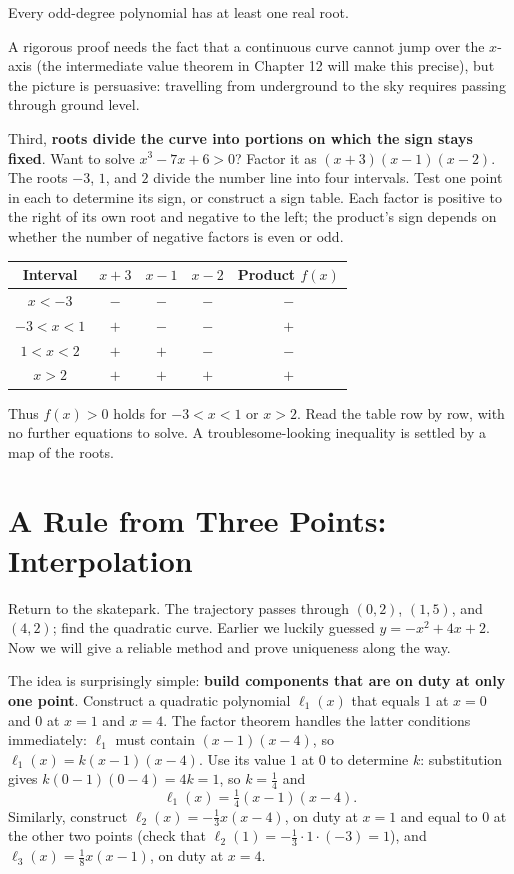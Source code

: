 \begin{tuilun}
Every odd-degree polynomial has at least one real root.
\end{tuilun}

A rigorous proof needs the fact that a continuous curve cannot jump over the $x$-axis (the intermediate value theorem in Chapter 12 will make this precise), but the picture is persuasive: travelling from underground to the sky requires passing through ground level.

Third, \textbf{roots divide the curve into portions on which the sign stays fixed}. Want to solve $x^3-7x+6>0$? Factor it as $(x+3)(x-1)(x-2)$. The roots $-3$, $1$, and $2$ divide the number line into four intervals. Test one point in each to determine its sign, or construct a sign table. Each factor is positive to the right of its own root and negative to the left; the product's sign depends on whether the number of negative factors is even or odd.

\begin{center}
\begin{tabular}{ccccc}
\toprule
Interval & $x+3$ & $x-1$ & $x-2$ & Product $f(x)$ \\
\midrule
$x<-3$ & $-$ & $-$ & $-$ & $-$ \\
$-3<x<1$ & $+$ & $-$ & $-$ & $+$ \\
$1<x<2$ & $+$ & $+$ & $-$ & $-$ \\
$x>2$ & $+$ & $+$ & $+$ & $+$ \\
\bottomrule
\end{tabular}
\end{center}

Thus $f(x)>0$ holds for $-3<x<1$ or $x>2$. Read the table row by row, with no further equations to solve. A troublesome-looking inequality is settled by a map of the roots.

\section{A Rule from Three Points: Interpolation}

Return to the skatepark. The trajectory passes through $(0,2)$, $(1,5)$, and $(4,2)$; find the quadratic curve. Earlier we luckily guessed $y=-x^2+4x+2$. Now we will give a reliable method and prove uniqueness along the way.

The idea is surprisingly simple: \textbf{build components that are on duty at only one point}. Construct a quadratic polynomial $\ell_1(x)$ that equals $1$ at $x=0$ and $0$ at $x=1$ and $x=4$. The factor theorem handles the latter conditions immediately: $\ell_1$ must contain $(x-1)(x-4)$, so $\ell_1(x)=k(x-1)(x-4)$. Use its value $1$ at $0$ to determine $k$: substitution gives $k(0-1)(0-4)=4k=1$, so $k=\frac{1}{4}$ and
\[
\ell_1(x)=\tfrac{1}{4}(x-1)(x-4).
\]
Similarly, construct $\ell_2(x)=-\tfrac{1}{3}x(x-4)$, on duty at $x=1$ and equal to $0$ at the other two points (check that $\ell_2(1)=-\frac{1}{3}\cdot 1\cdot(-3)=1$), and $\ell_3(x)=\tfrac{1}{8}x(x-1)$, on duty at $x=4$.


